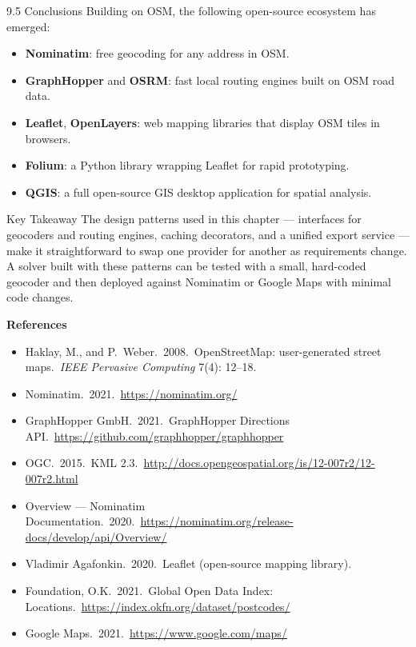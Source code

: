 \documentclass[aspectratio=169,10pt]{beamer}
\begin{document}
\begin{frame}[allowframebreaks]{9.5 Conclusions}
  Building on OSM, the following open-source ecosystem has emerged:
  \begin{itemize}
    \item \textbf{Nominatim}: free geocoding for any address in OSM.
    \item \textbf{GraphHopper} and \textbf{OSRM}: fast local routing engines
          built on OSM road data.
    \item \textbf{Leaflet}, \textbf{OpenLayers}: web mapping libraries that
          display OSM tiles in browsers.
    \item \textbf{Folium}: a Python library wrapping Leaflet for rapid
          prototyping.
    \item \textbf{QGIS}: a full open-source GIS desktop application for
          spatial analysis.
  \end{itemize}

  \begin{alertblock}{Key Takeaway}
    The design patterns used in this chapter --- interfaces for geocoders
    and routing engines, caching decorators, and a unified export service ---
    make it straightforward to swap one provider for another as requirements
    change.  A solver built with these patterns can be tested with a small,
    hard-coded geocoder and then deployed against Nominatim or Google Maps
    with minimal code changes.
  \end{alertblock}

  \framebreak

  \textbf{References}

  \begin{itemize}
    \item Haklay, M., and P.\ Weber.\ 2008.\ OpenStreetMap: user-generated
          street maps.\ \textit{IEEE Pervasive Computing} 7(4): 12--18.
    \item Nominatim.\ 2021.\ \url{https://nominatim.org/}
    \item GraphHopper GmbH.\ 2021.\ GraphHopper Directions API.\
          \url{https://github.com/graphhopper/graphhopper}
    \item OGC.\ 2015.\ KML 2.3.\
          \url{http://docs.opengeospatial.org/is/12-007r2/12-007r2.html}
    \item Overview --- Nominatim Documentation.\ 2020.\
          \url{https://nominatim.org/release-docs/develop/api/Overview/}
    \item Vladimir Agafonkin.\ 2020.\ Leaflet (open-source mapping library).
    \item Foundation, O.K.\ 2021.\ Global Open Data Index: Locations.\
          \url{https://index.okfn.org/dataset/postcodes/}
    \item Google Maps.\ 2021.\ \url{https://www.google.com/maps/}
  \end{itemize}

\end{frame}
\end{document}

